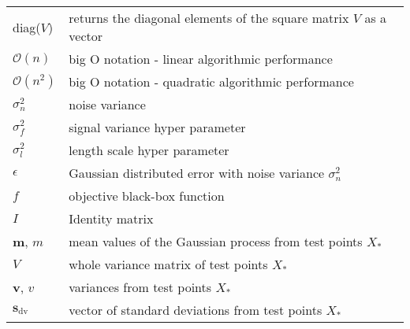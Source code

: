 \begin{tabular}{l l}
    diag($V$) & returns the diagonal elements of the square matrix $V$ as a vector\\
    $\mathcal{O}(n)$ & big O notation - linear algorithmic performance\\
    $\mathcal{O}(n^2)$ & big O notation - quadratic algorithmic performance\\
    $\sigma_n^2$ & noise variance\\
    $\sigma_f^2$ & signal variance hyper parameter\\
    $\sigma_l^2$ & length scale hyper parameter\\
    $\epsilon$ & Gaussian distributed error with noise variance $\sigma_n^2$\\
    $f$ & objective black-box function\\
    $I$ & Identity matrix\\
    $\mathbf{m}$, $m$ & mean values of the Gaussian process from test points $X_*$\\
    $V$ & whole variance matrix of test points $X_*$\\
    $\mathbf{v}$, $v$ & variances from test points $X_*$\\
    $\mathbf{s}_\mathrm{dv}$ & vector of standard deviations from test points $X_*$\\
\end{tabular}
